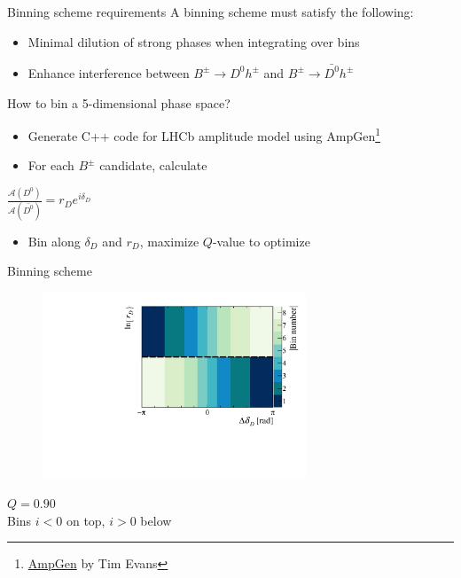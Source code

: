 \documentclass{beamer}
\begin{document}
\begin{frame}{Binning scheme requirements}
  \vspace{0.0cm}
  {\Large A binning scheme must satisfy the following:}
  \begin{itemize}
    \item{Minimal dilution of strong phases when integrating over bins}
    \item{Enhance interference between $B^\pm\to D^0h^\pm$ and $B^\pm\to\bar{D^0}h^\pm$}
  \end{itemize}
  \vspace{0.4cm}
  {\Large How to bin a 5-dimensional phase space?}
  \begin{itemize}
    \item{Generate C++ code for LHCb amplitude model using AmpGen\footnote{\href{https://github.com/GooFit/AmpGen}{AmpGen} by Tim Evans}}
    \item{For each $B^\pm$ candidate, calculate}
  \end{itemize}
  \begin{center}
    {\Large $\frac{\mathcal{A}(D^0)}{\mathcal{A}(\bar{D^0})} = r_De^{i\delta_D}$}
  \end{center}
  \begin{itemize}
    \item{Bin along $\delta_D$ and $r_D$, maximize $Q$-value to optimize}
  \end{itemize}
\end{frame}

\begin{frame}{Binning scheme}
  \begin{figure}
    \centering
    \includegraphics[width = 0.7\textwidth]{Plots/BinningSchemePlot_8Bins.pdf}
  \end{figure}
  \vspace{-1.0cm}
  \begin{center}
    $Q = 0.90$ \\
    Bins $i < 0$ on top, $i > 0$ below
  \end{center}
\end{frame}
\end{document}
